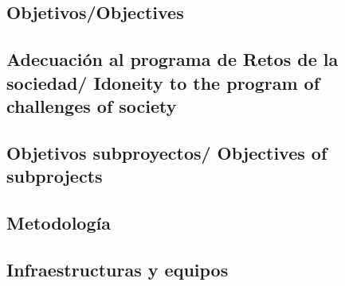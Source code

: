\documentclass[a4paper,11pt,oneside]{article}
\begin{document}
\subsection*{\sc Objetivos/Objectives}

%

\subsection*{\sc Adecuación al programa de Retos de la sociedad/ Idoneity to the program of challenges of society  }

%


\subsection*{\sc Objetivos subproyectos/ Objectives of subprojects}

%

%

%



%
%
%

\subsection*{\sc Metodología}

%



\subsection*{\sc Infraestructuras y equipos}

%
\end{document}
